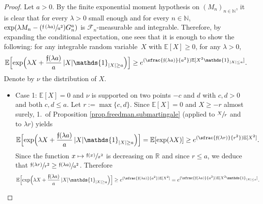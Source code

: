 \documentclass[10pt]{amsart}
\newcommand\mto{\mathchoice{\longmapsto}{\mapsto}{\mapsto}{\mapsto}}
\newcommand{\Psfrac}[2]{(\sfrac{#1}{#2})}
\theoremstyle{plain}
\theoremstyle{definition}
\newcommand\E{\mathbb{E}}
\newcommand\R{\mathbb{R}}
\newcommand\N{\mathbb{N}}
\begin{document}
\begin{proof} Let $a>0$. By the finite exponential moment hypothesis on $(M_n)_{n \in \N}$, it is clear that for every $\lambda>0$ small enough and for every $n \in \N$, $\exp(\lambda M_n - \Psfrac{\mathfrak{f}\,(\lambda a)}{a^2}G_n^a)$ is $\mathcal{F}_n$-measurable and integrable. Therefore, by expanding the conditional expectation, one sees that it is enough to show the following: for any integrable random variable~$X$ with $\E[X]\geq 0$, for any $\lambda>0$,
\begin{equation}\label{inequality.super}
\E\Bigl[\exp\Bigl(\lambda X + \frac{\mathfrak{f}(\lambda a)}{ a}\, |X| \mathds{1}_{|X|\geq a}\Bigr)\Bigr]
\geq e^{\Psfrac{\mathfrak{f}(\lambda a)}{a^2} \E[X^2 \mathds{1}_{|X| \leq a}]}.\end{equation}
Denote by $\nu$ the distribution of $X$.
\begin{itemize}
\item Case 1: $\E[X]=0$ and $\nu$ is supported on two points $-c$ and $d$ with $c,d>0$ and both $c,d \leq a$. Let $r:=\max\{c,d\}$.
Since $\E[X]= 0$ and
$X\geq -r$ almost surely, 1.~of Proposition \ref{prop.freedman.submartingale} (applied to $\sfrac{X}{r}$ and to $\lambda r$) yields
\[
\E\Bigl[\exp\Bigl(\lambda X + \frac{\mathfrak{f}(\lambda a)}{ a}\, |X| \mathds{1}_{|X|\geq a}\Bigr)\Bigr]= \E[\exp(\lambda X)]\geq e^{\Psfrac{\mathfrak{f}(\lambda r)}{r^2} \E[X^2]}.
\]
Since the function $x\mto \sfrac{\mathfrak{f}(x)}{x^2}$ is decreasing on $\R$ and since $r \leq a$, we deduce that $\sfrac{\mathfrak{f}(\lambda r)}{r^2}\geq \sfrac{\mathfrak{f}(\lambda a)}{a^2}$. Therefore
\[
\E\Bigl[\exp\Bigl(\lambda X + \frac{\mathfrak{f}(\lambda a)}{a}\, |X| \mathds{1}_{|X|\geq a}\Bigr)\Bigr]\geq e^{\Psfrac{\mathfrak{f}(\lambda a) }{a^2} \E[X^2]} = e^{\Psfrac{\mathfrak{f}(\lambda a)}{a^2} \E[X^2 \mathds{1}_{|X|\leq a}]}.
\]


\end{itemize}
\end{proof}
\end{document}
